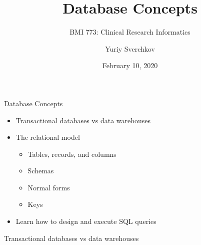 \documentclass[aspectratio=169]{beamer}
\title{Database Concepts}
\subtitle{BMI 773: Clinical Research Informatics}
\author{Yuriy Sverchkov}
\institute{University of Wisconsin--Madison}
\date{February 10, 2020}
\begin{document}
	
	{
		\begin{frame}[plain]
			\vskip4cm
			\titlepage
		\end{frame}
	}

	\begin{frame}{Database Concepts}
		\begin{itemize}
			\item Transactional databases vs data warehouses
			\item The relational model
			\begin{itemize}
				\item Tables, records, and columns
				\item Schemas
				\item Normal forms
				\item Keys
			\end{itemize}
			\item Learn how to design and execute SQL queries
		\end{itemize}
	\end{frame}

	\begin{frame}{Transactional databases vs data warehouses}
	\end{frame}
\end{document}
